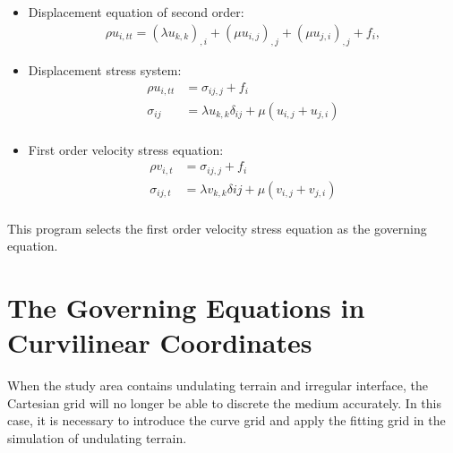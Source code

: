 \begin{itemize}
	\item Displacement equation of second order:	
	\begin{align}
	\rho u_{i,tt} = (\lambda u_{k,k})_{,i} + (\mu u_{i,j})_{,j} + (\mu u_{j,i})_{,j} +f_i ,
	\end{align}
	\item Displacement stress system:
	\begin{align}
		\rho u_{i,tt} & = \sigma_{ij,j} + f_i \\
		\sigma_{ij} & = \lambda u_{k,k} \delta_{ij} + \mu(u_{i,j}+u_{j,i}) \\
	\end{align}
	\item First order velocity stress equation:
	\begin{align}
		\rho v_{i,t} & = \sigma_{ij,j} + f_i \\
		\sigma_{ij,t} & = \lambda v_{k,k} \delta{ij} + \mu(v_{i,j}+v_{j,i}) \\
	\end{align}
\end{itemize}
This program selects the first order velocity stress equation as the governing equation.

\section{The Governing Equations in Curvilinear Coordinates} \label{appd_equations}
When the study area contains undulating terrain and irregular interface, the Cartesian grid will no longer be able to discrete the medium accurately. In this case, it is necessary to introduce the curve grid and apply the fitting grid in the simulation of undulating terrain.

